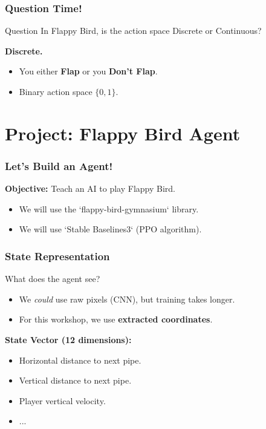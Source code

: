 \documentclass[aspectratio=169]{beamer}
\begin{document}
\begin{frame}
    \frametitle{Question Time!}
    \begin{alertblock}{Question}
        In Flappy Bird, is the action space Discrete or Continuous?
    \end{alertblock}
    \pause
    \textbf{Discrete.}
    \begin{itemize}
        \item You either \textbf{Flap} or you \textbf{Don't Flap}.
        \item Binary action space $\{0, 1\}$.
    \end{itemize}
\end{frame}

\section{Project: Flappy Bird Agent}

\begin{frame}
    \frametitle{Let's Build an Agent!}
    \textbf{Objective:} Teach an AI to play Flappy Bird.
    \vspace{0.5cm}
    \begin{itemize}
        \item We will use the `flappy-bird-gymnasium` library.
        \item We will use `Stable Baselines3` (PPO algorithm).
    \end{itemize}
\end{frame}

\begin{frame}
    \frametitle{State Representation}
    What does the agent see?
    \begin{itemize}
        \item We \textit{could} use raw pixels (CNN), but training takes longer.
        \item For this workshop, we use \textbf{extracted coordinates}.
    \end{itemize}
    \vspace{0.5cm}
    \textbf{State Vector (12 dimensions):}
    \begin{itemize}
        \item Horizontal distance to next pipe.
        \item Vertical distance to next pipe.
        \item Player vertical velocity.
        \item ...
    \end{itemize}
\end{frame}
\end{document}
